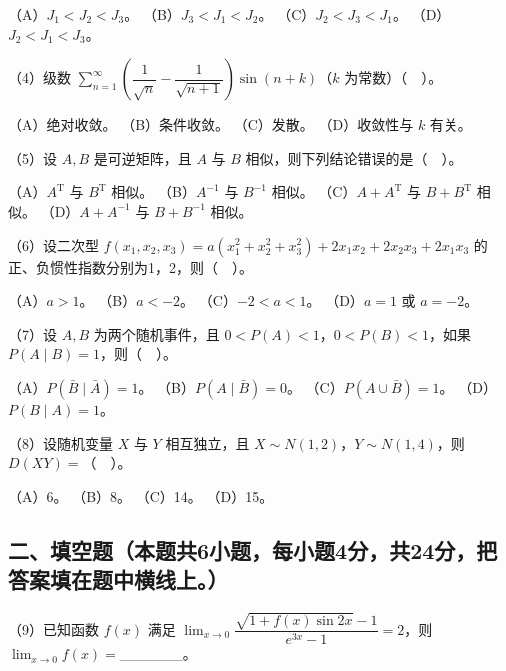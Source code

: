\documentclass[UTF8,12pt]{ctexart}
\begin{document}
（A）\(\displaystyle J_1<J_2<J_3\)。 （B）\(\displaystyle J_3<J_1<J_2\)。 （C）\(\displaystyle J_2<J_3<J_1\)。 （D）\(\displaystyle J_2<J_1<J_3\)。


（4）级数 \(\displaystyle \sum_{n=1}^{\infty}(\dfrac{\displaystyle 1}{\displaystyle \sqrt n}-\dfrac{\displaystyle 1}{\displaystyle \sqrt{n+1}})\sin(n+k)\)（\(\displaystyle k\) 为常数）（　）。


（A）绝对收敛。 （B）条件收敛。 （C）发散。 （D）收敛性与 \(\displaystyle k\) 有关。


（5）设 \(\displaystyle A,\allowbreak B\) 是可逆矩阵，且 \(\displaystyle A\) 与 \(\displaystyle B\) 相似，则下列结论错误的是（　）。


（A）\(\displaystyle A^{\mathrm T}\) 与 \(\displaystyle B^{\mathrm T}\) 相似。 （B）\(\displaystyle A^{-1}\) 与 \(\displaystyle B^{-1}\) 相似。 （C）\(\displaystyle A+A^{\mathrm T}\) 与 \(\displaystyle B+B^{\mathrm T}\) 相似。 （D）\(\displaystyle A+A^{-1}\) 与 \(\displaystyle B+B^{-1}\) 相似。


（6）设二次型 \(\displaystyle f(x_1,\allowbreak x_2,\allowbreak x_3)=a(x_1^2+x_2^2+x_3^2)+2x_1x_2+2x_2x_3+2x_1x_3\) 的正、负惯性指数分别为1，2，则（　）。


（A）\(\displaystyle a>1\)。 （B）\(\displaystyle a<-2\)。 （C）\(\displaystyle -2<a<1\)。 （D）\(\displaystyle a=1\) 或 \(\displaystyle a=-2\)。


（7）设 \(\displaystyle A,\allowbreak B\) 为两个随机事件，且 \(\displaystyle 0<P(A)<1\)，\(\displaystyle 0<P(B)<1\)，如果 \(\displaystyle P(A\mid B)=1\)，则（　）。


（A）\(\displaystyle P(\bar B\mid\bar A)=1\)。 （B）\(\displaystyle P(A\mid\bar B)=0\)。 （C）\(\displaystyle P(A\cup\bar B)=1\)。 （D）\(\displaystyle P(B\mid A)=1\)。


（8）设随机变量 \(\displaystyle X\) 与 \(\displaystyle Y\) 相互独立，且 \(\displaystyle X\sim N(1,\allowbreak 2)\)，\(\displaystyle Y\sim N(1,\allowbreak 4)\)，则 \(\displaystyle D(XY)=\)（　）。


（A）6。 （B）8。 （C）14。 （D）15。


\subsection*{二、填空题（本题共6小题，每小题4分，共24分，把答案填在题中横线上。）}

（9）已知函数 \(\displaystyle f(x)\) 满足 \(\displaystyle \lim_{x\to0}\dfrac{\displaystyle \sqrt{1+f(x)\sin2x}-1}{\displaystyle e^{3x}-1}=2\)，则 \(\displaystyle \lim_{x\to0}f(x)=\)\_\_\_\_\_\_。
\end{document}
